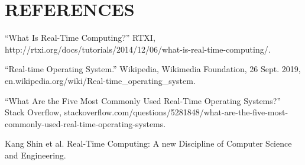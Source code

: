 \documentclass[letterpaper, 10 pt, conference]{IEEEconf}
\begin{document}
\section*{REFERENCES}


\begin{enumerate}[label={[\arabic*]}]
  \item “What Is Real-Time Computing?” RTXI, http://rtxi.org/docs/tutorials/2014/12/06/what-is-real-time-computing/.
  \item ``Real-time Operating System.'' Wikipedia, Wikimedia Foundation, 26 Sept. 2019, \\ en.wikipedia.org/wiki/Real-time\_operating\_system.
  \item “What Are the Five Most Commonly Used Real-Time Operating Systems?” Stack Overflow, stackoverflow.com/questions/5281848/what-are-the-five-most-commonly-used-real-time-operating-systems. 
  \item Kang Shin et al. Real-Time Computing: A new Discipline of Computer Science and Engineering.
\end{enumerate}
\end{document}
